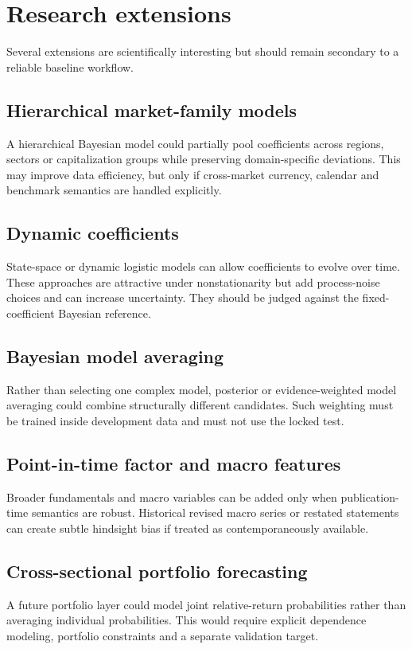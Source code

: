 \documentclass[11pt]{article}
\begin{document}
\section{Research extensions}
Several extensions are scientifically interesting but should remain secondary to a reliable baseline workflow.

\subsection{Hierarchical market-family models}
A hierarchical Bayesian model could partially pool coefficients across regions, sectors or capitalization groups while preserving domain-specific deviations. This may improve data efficiency, but only if cross-market currency, calendar and benchmark semantics are handled explicitly.

\subsection{Dynamic coefficients}
State-space or dynamic logistic models can allow coefficients to evolve over time. These approaches are attractive under nonstationarity but add process-noise choices and can increase uncertainty. They should be judged against the fixed-coefficient Bayesian reference.

\subsection{Bayesian model averaging}
Rather than selecting one complex model, posterior or evidence-weighted model averaging could combine structurally different candidates. Such weighting must be trained inside development data and must not use the locked test.

\subsection{Point-in-time factor and macro features}
Broader fundamentals and macro variables can be added only when publication-time semantics are robust. Historical revised macro series or restated statements can create subtle hindsight bias if treated as contemporaneously available.

\subsection{Cross-sectional portfolio forecasting}
A future portfolio layer could model joint relative-return probabilities rather than averaging individual probabilities. This would require explicit dependence modeling, portfolio constraints and a separate validation target.
\end{document}
